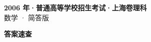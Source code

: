 \documentclass[zihao=-4, a4paper]{ctexart}
\begin{document}
\begin{center}
  {\Large\bfseries 2006 年·普通高等学校招生考试·上海卷理科}\\[4pt]
  {\large 数学 · 简答版}
\end{center}
\medskip
{}

\clearpage
{}
\begin{center}{\Large\bfseries 答案速查}\end{center}
\medskip

\end{document}

